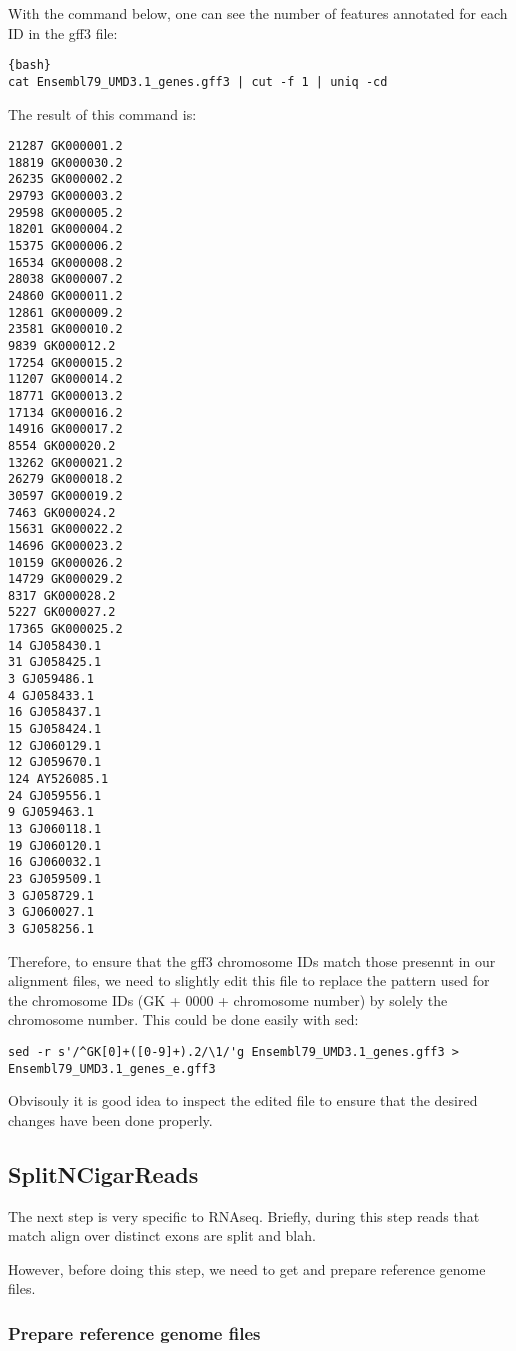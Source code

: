 With the command below, one can see the number of features annotated for each ID in the gff3 file: 

\begin{verbatim}{bash}
cat Ensembl79_UMD3.1_genes.gff3 | cut -f 1 | uniq -cd
\end{verbatim}


The result of this command is:
\begin{verbatim}
21287 GK000001.2
18819 GK000030.2
26235 GK000002.2
29793 GK000003.2
29598 GK000005.2
18201 GK000004.2
15375 GK000006.2
16534 GK000008.2
28038 GK000007.2
24860 GK000011.2
12861 GK000009.2
23581 GK000010.2
9839 GK000012.2
17254 GK000015.2
11207 GK000014.2
18771 GK000013.2
17134 GK000016.2
14916 GK000017.2
8554 GK000020.2
13262 GK000021.2
26279 GK000018.2
30597 GK000019.2
7463 GK000024.2
15631 GK000022.2
14696 GK000023.2
10159 GK000026.2
14729 GK000029.2
8317 GK000028.2
5227 GK000027.2
17365 GK000025.2
14 GJ058430.1
31 GJ058425.1
3 GJ059486.1
4 GJ058433.1
16 GJ058437.1
15 GJ058424.1
12 GJ060129.1
12 GJ059670.1
124 AY526085.1
24 GJ059556.1
9 GJ059463.1
13 GJ060118.1
19 GJ060120.1
16 GJ060032.1
23 GJ059509.1
3 GJ058729.1
3 GJ060027.1
3 GJ058256.1
\end{verbatim}

Therefore, to ensure that the gff3 chromosome IDs match those presennt in our alignment files, we need to slightly edit this file to replace the pattern used for the chromosome IDs (GK + 0000 + chromosome number) by solely the chromosome number. This could be done easily with sed:

\begin{verbatim}
sed -r s'/^GK[0]+([0-9]+).2/\1/'g Ensembl79_UMD3.1_genes.gff3 > Ensembl79_UMD3.1_genes_e.gff3
\end{verbatim}

Obvisouly it is good idea to inspect the edited file to ensure that the desired changes have been done properly.

\subsection{SplitNCigarReads}

The next step is very specific to RNAseq. Briefly, during this step reads that match align over distinct exons are split and blah.

However, before doing this step, we need to get and prepare reference genome files.

\subsubsection{Prepare reference genome files}

